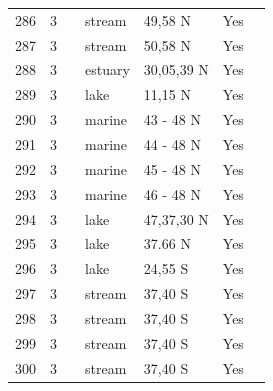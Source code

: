 \documentclass[12pt]{article}
\begin{document}
\begin{landscape}
\begin{table}[h!]
{\begin{tabular}{p{2.8cm}p{1.3cm}p{3cm}p{2.2cm}p{2.5cm}lp{8.2cm}}
        286   & 3 & \cite{Cromar1996}  & stream & 49,58 N & Yes   &       \\
        287   & 3 & \cite{Cromar1996}  & stream & 50,58 N & Yes   &       \\
        288   & 3 & \cite{Christian1999}    & estuary & 30,05,39 N & Yes  &     \\
        289   & 3 & \cite{Fetahi2011}  & lake  & 11,15 N & Yes  &     \\
        290   & 3 & \cite{Brodeur1992}    & marine & 43 - 48 N & Yes  &     \\
        291   & 3 & \cite{Brodeur1992}    & marine & 44 - 48 N & Yes  &     \\
        292   & 3 & \cite{Brodeur1992}    & marine & 45 - 48 N & Yes  &     \\
        293   & 3 & \cite{Brodeur1992}    & marine & 46 - 48 N & Yes  &     \\
        294   & 3 & \cite{Gaedke1994}  & lake  & 47,37,30 N & Yes   &       \\
        295   & 3 & \cite{Preston2012}    & lake  & 37.66 N & Yes   &        \\
        296   & 3 & \cite{Ratsirarson1996}  & lake  & 24,55 S & Yes  &     \\
        297   & 3 & \cite{Closs1994}  & stream & 37,40 S & Yes   &       \\
        298   & 3 & \cite{Closs1994}  & stream & 37,40 S & Yes   &       \\
        299   & 3 & \cite{Closs1994}  & stream & 37,40 S & Yes   &       \\
        300   & 3 & \cite{Closs1994}  & stream & 37,40 S & Yes   &       \\
         \hline
      \end{tabular}}%
      \end{table}

        \newpage


\end{landscape}
\end{document}
